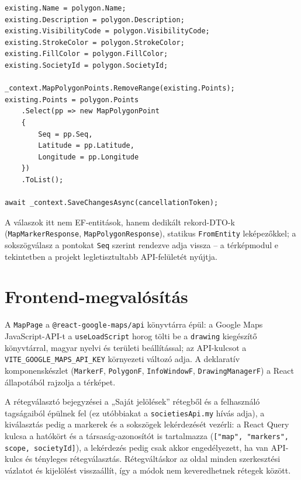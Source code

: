 \begin{lstlisting}[language={[Sharp]C}, caption={A sokszög csúcspontjainak cseréje a \texttt{MapService.UpdatePolygonAsync} metódusban (kivonat)}, label={lst:map-points}]
existing.Name = polygon.Name;
existing.Description = polygon.Description;
existing.VisibilityCode = polygon.VisibilityCode;
existing.StrokeColor = polygon.StrokeColor;
existing.FillColor = polygon.FillColor;
existing.SocietyId = polygon.SocietyId;

_context.MapPolygonPoints.RemoveRange(existing.Points);
existing.Points = polygon.Points
    .Select(pp => new MapPolygonPoint
    {
        Seq = pp.Seq,
        Latitude = pp.Latitude,
        Longitude = pp.Longitude
    })
    .ToList();

await _context.SaveChangesAsync(cancellationToken);
\end{lstlisting}

A válaszok itt nem EF-entitások, hanem dedikált rekord-DTO-k (\texttt{MapMarkerResponse},
\texttt{MapPolygonResponse}), statikus \texttt{FromEntity} leképezőkkel; a sokszögválasz a
pontokat \texttt{Seq} szerint rendezve adja vissza -- a térképmodul e tekintetben a projekt
legletisztultabb API-felületét nyújtja.

\section{Frontend-megvalósítás}
\label{sec:map-frontend}

A \texttt{MapPage} a \texttt{@react-google-maps/api} könyvtárra épül: a Google Maps
JavaScript-API-t a \texttt{useLoadScript} horog tölti be a \texttt{drawing} kiegészítő
könyvtárral, magyar nyelvi és területi beállítással; az API-kulcsot a
\texttt{VITE\_GOOGLE\_MAPS\_API\_KEY} környezeti változó adja. A deklaratív komponenskészlet
(\texttt{MarkerF}, \texttt{PolygonF}, \texttt{InfoWindowF}, \texttt{DrawingManagerF}) a React
állapotából rajzolja a térképet.

A rétegválasztó bejegyzései a „Saját jelölések” rétegből és a felhasználó tagságaiból épülnek fel
(ez utóbbiakat a \texttt{societiesApi.my} hívás adja), a kiválasztás pedig a markerek és a
sokszögek lekérdezését vezérli: a React Query kulcsa a hatókört és a társaság-azonosítót is
tartalmazza (\texttt{["map", "markers", scope, societyId]}), a lekérdezés pedig csak akkor
engedélyezett, ha van API-kulcs és tényleges rétegválasztás. Rétegváltáskor az oldal minden
szerkesztési vázlatot és kijelölést visszaállít, így a módok nem keveredhetnek rétegek között.

